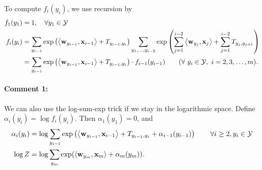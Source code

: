 \documentclass[11pt]{report}
\begin{document}
To compute $f_i(y_i)$, we use recursion by
\begin{align}
		\label{eq:rec_Z_forward_1}
	f_1(y_1) &= 1, \quad \forall y_1 \in \mathcal{Y} \\
	f_i(y_i) &= \sum_{y_{i-1}} \exp \left(\left\langle \mathbf{\boldsymbol{w}}_{y_{i-1}},\mathbf{\boldsymbol{x}}_{i-1} \right\rangle + T_{y_{i-1}, y_i}\right)
	\sum_{y_1, \ldots, y_{i-2}} \exp \left(\sum_{j=1}^{i-2} \left\langle \mathbf{\boldsymbol{w}}_{y_j},\mathbf{\boldsymbol{x}}_j \right\rangle + \sum_{j=1}^{i-2} T_{y_j, y_{j+1}}\right) \\
		\label{eq:rec_Z_forward_2}
	&= \sum_{y_{i-1}} \exp \left(\left\langle \mathbf{\boldsymbol{w}}_{y_{i-1}},\mathbf{\boldsymbol{x}}_{i-1} \right\rangle + T_{y_{i-1}, y_i}\right)  \cdot f_{i-1}(y_{i-1})  \qquad (\forall\ y_i \in \mathcal{Y}, \ i = 2, 3, \ldots, m).	 
\end{align}

\paragraph{Comment 1:}
We can also use the log-sum-exp trick if we stay in the logarithmic space. 
Define $\alpha_i(y_i) = \log f_i(y_i)$.
Then $\alpha_1(y_1) = 0$, and
\begin{align}
	\alpha_i(y_i) &= \log \sum_{y_{i-1}} \exp \left(\left\langle \mathbf{\boldsymbol{w}}_{y_{i-1}},\mathbf{\boldsymbol{x}}_{i-1} \right\rangle + T_{y_{i-1}, y_i} + \alpha_{i-1}(y_{i-1})\right) \qquad \forall i \ge 2, y_i \in \mathcal{Y}\\
	\log Z &= \log \sum_{y_m} \exp (\left\langle \mathbf{\boldsymbol{w}}_{y_m},\mathbf{\boldsymbol{x}}_m \right\rangle + \alpha_m(y_m)).
\end{align}
\end{document}
